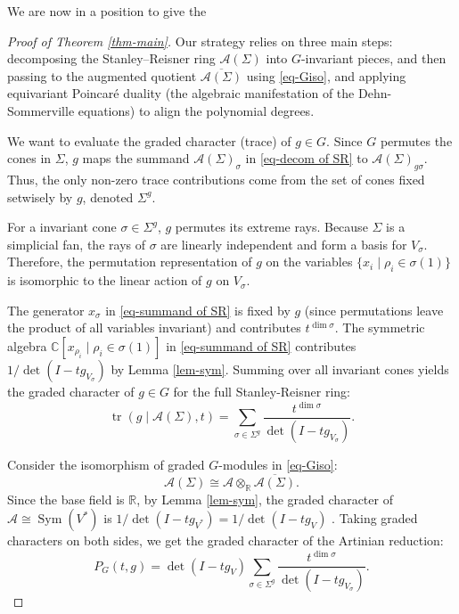 \documentclass{amsart}
\theoremstyle{definition}
\theoremstyle{remark}
\numberwithin{equation}{section}
\begin{document}
We are now in a position to give the
\begin{proof}[Proof of Theorem \ref{thm-main}]
Our strategy relies on three main steps: decomposing the Stanley--Reisner ring $\mathcal{A}(\Sigma)$ into $G$-invariant pieces, and then passing to the augmented quotient $\overline{\mathcal{A}(\Sigma)}$ using \eqref{eq-Giso}, 
and applying equivariant Poincaré duality (the algebraic manifestation of the Dehn-Sommerville equations) to align the polynomial degrees.

We want to evaluate the graded character (trace) of $g \in G$. Since $G$ permutes the cones in $\Sigma$, $g$ maps the summand $\mathcal{A}(\Sigma)_\sigma$ in \eqref{eq-decom of SR} to $\mathcal{A}(\Sigma)_{g\sigma}$. Thus, the only non-zero trace contributions come from the set of cones fixed setwisely by $g$, denoted $\Sigma^g$. 

For a invariant cone $\sigma \in \Sigma^g$, $g$ permutes its extreme rays. Because $\Sigma$ is a simplicial fan, the rays of $\sigma$ are linearly independent and form a basis for $V_\sigma$. Therefore, the permutation representation of $g$ on the variables $\{x_i \mid \rho_i \in \sigma(1)\}$ is isomorphic to the linear action of $g$ on $V_\sigma$. 

The generator $x_\sigma$ in \eqref{eq-summand of SR} is fixed by $g$ (since permutations leave the product of all variables invariant) and contributes $t^{\dim \sigma}$. The symmetric algebra $\mathbb{C}[x_{\rho_i} \mid \rho_i \in \sigma(1)]$ in \eqref{eq-summand of SR} contributes $1 / \operatorname{det}(I - t g_{V_\sigma})$ by Lemma \ref{lem-sym}. Summing over all invariant cones yields the graded character of $g \in G$ for the full Stanley-Reisner ring:
$$\operatorname{tr}(g \mid \mathcal{A}(\Sigma), t) = \sum_{\sigma \in \Sigma^g} \frac{t^{\dim \sigma}}{\operatorname{det}(I - t g_{V_\sigma})}.$$

Consider the isomorphism of graded $G$-modules in \eqref{eq-Giso}:
$$\mathcal{A}(\Sigma)\cong \mathcal{A}\otimes_{\mathbb{R}}\overline{\mathcal{A}(\Sigma)}.$$
Since the base field is $\mathbb{R}$, by Lemma \ref{lem-sym}, the graded character of $\mathcal{A}\cong\operatorname{Sym}(V^*)$ is $1 / \operatorname{det}(I - t g_{V^*}) = 1 / \operatorname{det}(I - t g_V)$  . Taking graded characters on both sides, we get the graded character of the Artinian reduction:
\begin{equation} \label{eq-cha from Giso}
  P_G(t, g) = \operatorname{det}(I - t g_V) \sum_{\sigma \in \Sigma^g} \frac{t^{\dim \sigma}}{\operatorname{det}(I - t g_{V_\sigma})}. 
\end{equation}


\end{proof}
\end{document}

